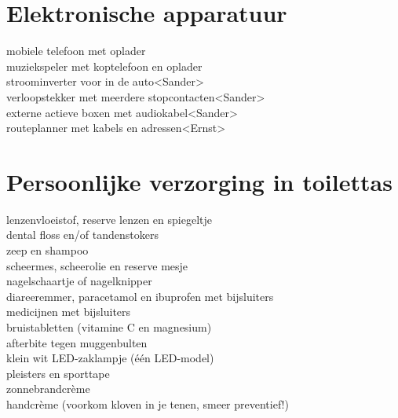 \documentclass[9pt,twocolumn]{memoir}
\begin{document}
\section*{Elektronische apparatuur}
mobiele telefoon met oplader\\
muziekspeler met koptelefoon en oplader\\
stroominverter voor in de auto\hfill<Sander>\\
verloopstekker met meerdere stopcontacten\hfill<Sander>\\
externe actieve boxen met audiokabel\hfill<Sander>\\
routeplanner met kabels en adressen\hfill<Ernst>

\section*{Persoonlijke verzorging in toilettas}
lenzenvloeistof, reserve lenzen en spiegeltje\\
dental floss en/of tandenstokers\\
zeep en shampoo\\
scheermes, scheerolie en reserve mesje\\
nagelschaartje of nagelknipper\\
diareeremmer, paracetamol en ibuprofen met bijsluiters\\
medicijnen met bijsluiters\\
bruistabletten (vitamine C en magnesium)\\
afterbite tegen muggenbulten\\
klein wit LED-zaklampje (één LED-model)\\
pleisters en sporttape\\
zonnebrandcrème\\
handcrème (voorkom kloven in je tenen, smeer preventief!)
\end{document}
